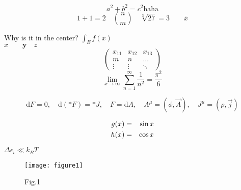 \documentclass[10pt,a4paper]{article}
\newcommand{\ud}{\mathrm{d}}%
\begin{document}
\begin{displaymath}%
a^{2}+b^{2}=c^{2}\textrm{haha}%
\end{displaymath}
\[
1+1=2 \quad \binom{n}{m} %
 \quad  \sqrt[3]{27}=3 \qquad \overline{x}
\]
\begin{flushleft}

Why is it in the center? $\int_{E}f(x)$\\
$x \qquad \bm y \quad z$ %
\[
\left(\begin{array}{ccc}
x_{11}&x_{12}&x_{13}\\
m&n&\ldots\\
\vdots&\vdots&\ddots
\end{array}\right)
\]
\begin{equation}
\lim_{x\to\infty}\sum_{n=1}^{\infty}\frac{1}{n^{2}}=\frac{\pi^{2}}{6}
\end{equation}

\begin{equation}
\ud F=0, \quad \ud\left(*F\right)=*J, \quad F=\ud A, \quad A^{\mu}=\left(\phi,\overrightarrow{A}\right), \quad J^{\mu}=\left(\rho, \overrightarrow{j}\right)
\end{equation}

\begin{eqnarray} %
g(x)&=&\sin{x} \notag \\
h(x)&=&\cos{x}
\end{eqnarray}

$\Delta \epsilon_{i} \ll k_{B}T$

\begin{figure}[!htp] %
\centering
\texttt{[image: figure1]}
\caption{Fig.1}
\end{figure}


\end{flushleft}
\end{document}
